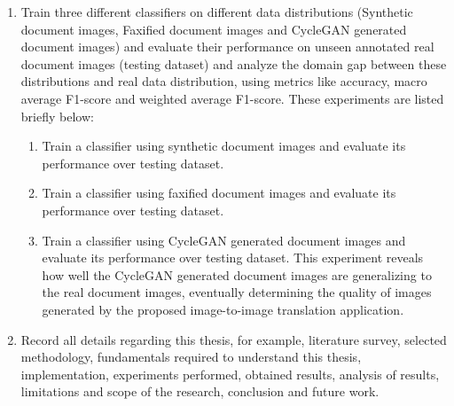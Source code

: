 \begin{enumerate}
\item Train three different classifiers on different data distributions (Synthetic document images, Faxified document images and \ac{CycleGAN} generated document images) and evaluate their performance on unseen annotated real document images (testing dataset) and analyze the domain gap between these distributions and real data distribution, using metrics like accuracy, macro average F1-score and weighted average F1-score. These experiments are listed briefly below:
	\begin{enumerate}
	     	\item Train a classifier using synthetic document images and evaluate its performance over testing dataset.
     	     	\item Train a classifier using faxified document images and evaluate its performance over testing dataset.
     		\item Train a classifier using \ac{CycleGAN} generated document images and evaluate its performance over testing dataset. This experiment reveals how well the \ac{CycleGAN} generated document images are generalizing to the real document images, eventually determining the quality of images generated by the proposed image-to-image translation application.
    	\end{enumerate}
\item Record all details regarding this thesis, for example, literature survey, selected methodology, fundamentals required to understand this thesis, implementation, experiments performed, obtained results, analysis of results, limitations and scope of the research, conclusion and future work.
\end{enumerate}





